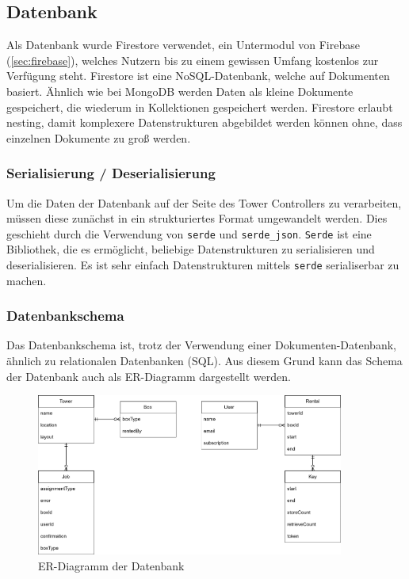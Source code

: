 \subsection{Datenbank}

Als Datenbank wurde Firestore verwendet, ein Untermodul von Firebase (\ref{sec:firebase}), welches Nutzern bis zu einem gewissen Umfang kostenlos zur Verfügung steht. Firestore ist eine \Gls{NoSQL}-Datenbank, welche auf Dokumenten basiert. Ähnlich wie bei \Gls{MongoDB} werden Daten als kleine Dokumente gespeichert, die wiederum in Kollektionen gespeichert werden. Firestore erlaubt \gls{nesting}, damit komplexere Datenstrukturen abgebildet werden können ohne, dass einzelnen Dokumente zu groß werden.


\subsubsection{\Gls{Serialisierung} / \Gls{Deserialisierung}}

Um die Daten der Datenbank auf der Seite des Tower Controllers zu verarbeiten, müssen diese zunächst in ein strukturiertes Format umgewandelt werden. Dies geschieht durch die Verwendung von \texttt{serde} und \texttt{serde\_json}. \texttt{Serde} ist eine Bibliothek, die es ermöglicht, beliebige Datenstrukturen zu serialisieren und deserialisieren. Es ist sehr einfach Datenstrukturen mittels \texttt{serde} serialiserbar zu machen.


\subsubsection{Datenbankschema}
Das Datenbankschema ist, trotz der Verwendung einer Dokumenten-Datenbank, ähnlich zu \gls{relational}en Datenbanken (SQL). Aus diesem Grund kann das Schema der Datenbank auch als \ac{ER}-Diagramm dargestellt werden.

\begin{figure}[H]
    \centering
    \includegraphics[width=0.9\textwidth]{images/datenbankstruktur.png}
    \caption{ER-Diagramm der Datenbank}
    \label{fig:er_diagramm}
\end{figure}

